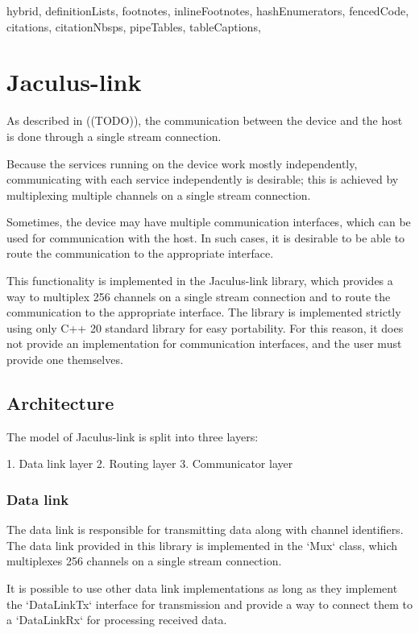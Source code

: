 \begin{markdown*}{%
  hybrid,
  definitionLists,
  footnotes,
  inlineFootnotes,
  hashEnumerators,
  fencedCode,
  citations,
  citationNbsps,
  pipeTables,
  tableCaptions,
}

\chapter{Jaculus-link}

As described in ((TODO)), the communication between the device and the host is done through a single stream connection.

Because the services running on the device work mostly independently, communicating with each service independently is desirable; this is achieved by multiplexing multiple channels on a single stream connection.

Sometimes, the device may have multiple communication interfaces, which can be used for communication with the host. In such cases, it is desirable to be able to route the communication to the appropriate interface.

This functionality is implemented in the Jaculus-link library, which provides a way to multiplex 256 channels on a single stream connection and to route the communication to the appropriate interface. The library is implemented strictly using only C++ 20 standard library for easy portability. For this reason, it does not provide an implementation for communication interfaces, and the user must provide one themselves.

\section{Architecture}

The model of Jaculus-link is split into three layers:

1. Data link layer
2. Routing layer
3. Communicator layer

\subsection{Data link}

The data link is responsible for transmitting data along with channel identifiers. The data link provided in this library is implemented in the `Mux` class, which multiplexes 256 channels on a single stream connection.

It is possible to use other data link implementations as long as they implement the `DataLinkTx` interface for transmission and provide a way to connect them to a `DataLinkRx` for processing received data.


\end{markdown*}
